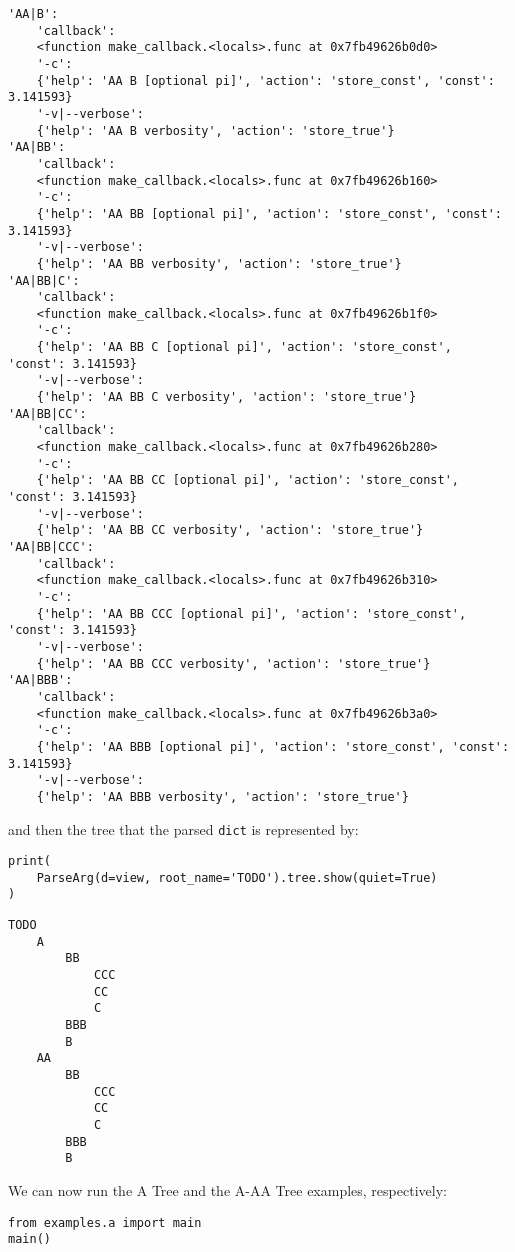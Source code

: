 \documentclass[10pt]{amsart}
\numberwithin{equation}{section}
\begin{document}
\begin{verbatim}
'AA|B':
    'callback':
    <function make_callback.<locals>.func at 0x7fb49626b0d0>
    '-c':
    {'help': 'AA B [optional pi]', 'action': 'store_const', 'const': 3.141593}
    '-v|--verbose':
    {'help': 'AA B verbosity', 'action': 'store_true'}
'AA|BB':
    'callback':
    <function make_callback.<locals>.func at 0x7fb49626b160>
    '-c':
    {'help': 'AA BB [optional pi]', 'action': 'store_const', 'const': 3.141593}
    '-v|--verbose':
    {'help': 'AA BB verbosity', 'action': 'store_true'}
'AA|BB|C':
    'callback':
    <function make_callback.<locals>.func at 0x7fb49626b1f0>
    '-c':
    {'help': 'AA BB C [optional pi]', 'action': 'store_const', 'const': 3.141593}
    '-v|--verbose':
    {'help': 'AA BB C verbosity', 'action': 'store_true'}
'AA|BB|CC':
    'callback':
    <function make_callback.<locals>.func at 0x7fb49626b280>
    '-c':
    {'help': 'AA BB CC [optional pi]', 'action': 'store_const', 'const': 3.141593}
    '-v|--verbose':
    {'help': 'AA BB CC verbosity', 'action': 'store_true'}
'AA|BB|CCC':
    'callback':
    <function make_callback.<locals>.func at 0x7fb49626b310>
    '-c':
    {'help': 'AA BB CCC [optional pi]', 'action': 'store_const', 'const': 3.141593}
    '-v|--verbose':
    {'help': 'AA BB CCC verbosity', 'action': 'store_true'}
'AA|BBB':
    'callback':
    <function make_callback.<locals>.func at 0x7fb49626b3a0>
    '-c':
    {'help': 'AA BBB [optional pi]', 'action': 'store_const', 'const': 3.141593}
    '-v|--verbose':
    {'help': 'AA BBB verbosity', 'action': 'store_true'}
\end{verbatim}
and then the tree that the parsed \texttt{dict} is represented by:
\begin{verbatim}
print(
    ParseArg(d=view, root_name='TODO').tree.show(quiet=True)
)
\end{verbatim}

\begin{verbatim}
TODO
    A
        BB
            CCC
            CC
            C
        BBB
        B
    AA
        BB
            CCC
            CC
            C
        BBB
        B
\end{verbatim}


We can now run the A Tree and the A-AA Tree examples, respectively:
\begin{verbatim}
from examples.a import main
main()
\end{verbatim}
\end{document}

